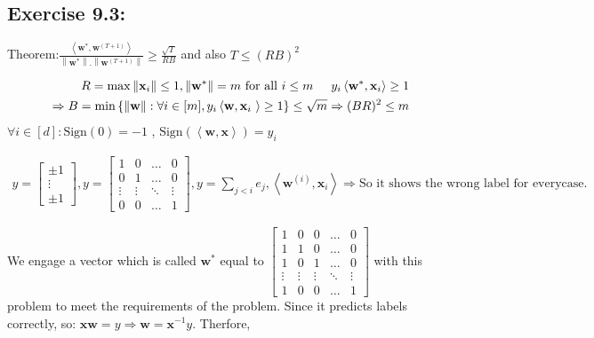 \documentclass[]{book}
\begin{document}
\subsection*{Exercise 9.3:}

Theorem:$\frac{\left \langle \textbf{w}^* , \textbf{w}^{(T+1)}\right \rangle}{\left \| \textbf{w}^* \right \|.\left \| \textbf{w}^{(T+1)} \right \|}\geq \frac{\sqrt T}{RB}$
and also $T\leq (RB)^2$

\begin{align*}
    R=\max \left \| \textbf{x}_i \right \|\leq 1,\left \| \textbf{w}^* \right \|=m \text{  for all  }i\leq m \hspace{0.5cm}y_i\left \langle \textbf{w}^*,\textbf{x}_i \right \rangle \geq 1 \\
\Rightarrow  B=\min \left \{ \left \| \textbf{w} \right \|:\forall i\in [m],y_i\left \langle \textbf{w},\textbf{x}_i\ \right \rangle \geq 1 \right \}\leq \sqrt m \Rightarrow (BR)^2\leq m
\end{align*}
 $\forall i\in [d]:\text{Sign}(0)=-1$ , $\text{Sign}(\left \langle \textbf{w},\textbf{x} \right \rangle)=y_i$
 
 \begin{align*}
     y=\begin{bmatrix}
\pm1\\ 
\vdots\\ 
\pm1
\end{bmatrix},
y=\begin{bmatrix}
1 & 0 & \dots & 0\\ 
0 & 1 & \dots & 0\\ 
\vdots & \vdots  & \ddots & \vdots\\ 
0 & 0 & \dots & 1
\end{bmatrix}
, y=\sum_{j<i}e_j,\left \langle \textbf{w}^{(i)},\textbf{x}_i \right \rangle\Rightarrow \text{{So it shows the wrong label for everycase.}}
 \end{align*}

We engage a vector which is called $\textbf{w}^*$ equal to $\begin{bmatrix}
1 & 0 &  0 & \dots & 0\\ 
1 & 1 & 0 & \dots & 0\\ 
1 & 0 & 1 & \dots & 0\\ 
\vdots & \vdots  & \vdots & \ddots & \vdots\\ 
1 & 0 & 0 & \dots & 1
\end{bmatrix}$ with this problem to meet the requirements of the problem. Since it predicts labels correctly, so: $\textbf{x}\textbf{w}=y\Rightarrow\textbf{w}=\textbf{x}^{-1}y$. Therfore,
\end{document}
